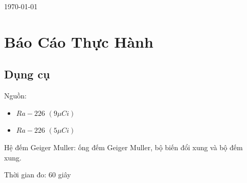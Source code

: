 \documentclass{article}
\begin{document}
\begin{titlepage}
\vspace{7cm}

{\large \today}\\[2cm] %


 

\vfill %

\end{titlepage}

\newpage
\null
\thispagestyle{empty}%
\addtocounter{page}{-1}%
\newpage

\section{\LARGE Báo Cáo Thực Hành}

\subsection{Dụng cụ}

Nguồn:
\begin{itemize}
  \item $Ra-226$ $(9\mu Ci)$
  \item $Ra-226$ $(5\mu Ci)$
\end{itemize}

Hệ đếm Geiger Muller: ống đếm Geiger Muller, bộ biến đổi xung và bộ đếm xung.

Thời gian đo: 60 giây
\end{document}
